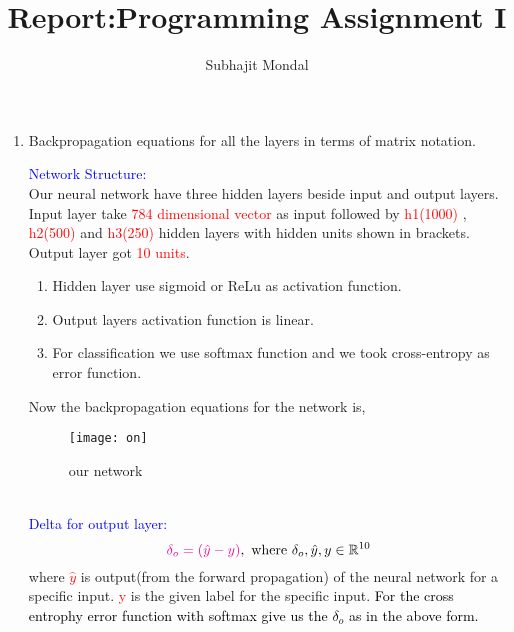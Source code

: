 \documentclass[12pt,a4paper]{article}
\newenvironment{QandA}{\begin{enumerate}[label=\bfseries\alph*.]\bfseries}
                      {\end{enumerate}}
\newenvironment{answered}{\par\normalfont}{}
\begin{document}
\title{ Report:Programming Assignment I}
\author{Subhajit Mondal}
\date{\vspace{-5ex}}
\maketitle
\noindent%
\begin{QandA}
   \item Backpropagation equations for all the layers in terms of matrix notation.
         \begin{answered}
         \textcolor{blue}{Network Structure:\\}Our neural network have three hidden layers beside input and output layers.\\
         Input layer take \textcolor{red}{784 dimensional vector} as input followed by \textcolor{red}{h1(1000)} , \textcolor{red}{h2(500)} and \textcolor{red}{h3(250)} hidden layers with hidden units shown in brackets. Output layer got \textcolor{red}{10 units}.   
         \begin{enumerate}
  			 \item Hidden layer use sigmoid or ReLu as activation function.
  			 \item Output layers activation function is linear.
  		     \item For classification we use softmax function and we took cross-entropy as error function.
		 \end{enumerate}
		 Now the backpropagation equations for the network is,
		 \begin{figure}[h!]
	\begin{center}
		\texttt{[image: on]}
		\caption{our network }
		\label{fig:snr20fft}
	\end{center}
		
\end{figure}\\
		 
         \textcolor{blue}{Delta for output layer:\\}  
         \begin{equation}
        \textcolor{magenta}{ \delta_o=(\hat{y}-y)},  \text{    where } \delta_o, \hat{y}, y \in \mathbb{R}^{10} 
         \end{equation}
         where \textcolor{red}{$\hat{y}$} is output(from the forward propagation) of the neural network for a specific input. \textcolor{red}{y} is the given label for the specific input. \textcolor{black}{For the cross entrophy error function with softmax give us the $\delta_o$ as in the above form.}\\
		

\end{answered}
\end{QandA}
\end{document}
